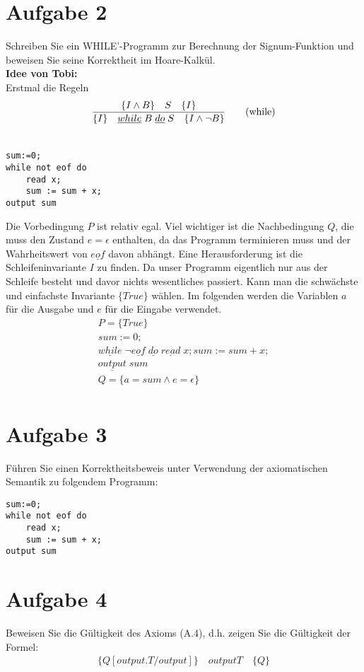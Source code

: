 \documentclass[ngerman,a4paper]{report}
\begin{document}
\section*{Aufgabe 2}
Schreiben Sie ein WHILE'-Programm zur Berechnung der Signum-Funktion und beweisen Sie seine Korrektheit im Hoare-Kalkül.\\
\textbf{Idee von Tobi:}\\
Erstmal die Regeln
\begin{align}
\frac{\{I\land B\}\quad S\quad\{I\}}{\{I\}\quad \underline{while}\;B\;\underline{do}\;S\quad\{I\land \lnot B\}}\tag{while}\\
\notag
\end{align}
\begin{lstlisting}
sum:=0;
while not eof do
	read x;
	sum := sum + x;
output sum
\end{lstlisting}
Die Vorbedingung $P$ ist relativ egal. Viel wichtiger ist die Nachbedingung $Q$, die muss den Zustand $e=\epsilon$ enthalten, da das Programm terminieren muss und der Wahrheitswert von $\underline{eof}$ davon abhängt. Eine Herausforderung ist die Schleifeninvariante $I$ zu finden. Da unser Programm eigentlich nur aus der Schleife besteht und davor nichts wesentliches passiert. Kann man die schwächste und einfachste Invariante $\{True\}$ wählen. Im folgenden werden die Variablen $a$ für die Ausgabe und $e$ für die Eingabe verwendet.
\begin{align*}
P = \{True\}	\\
sum:=0;																		\\
\underline{while}\; \lnot \underline{eof}\; \underline{do}\;
	\underline{read}\; x;
	sum := sum + x;															\\
\underline{output}\; sum																	\\
Q = \{a = sum \land e = \epsilon \}\\
\end{align*}
\section*{Aufgabe 3}
Führen Sie einen Korrektheitsbeweis unter Verwendung der axiomatischen Semantik zu folgendem Programm:\\
\begin{lstlisting}
sum:=0;
while not eof do
	read x;
	sum := sum + x;
output sum
\end{lstlisting}
\section*{Aufgabe 4}
Beweisen Sie die Gültigkeit des Axioms (A.4), d.h. zeigen Sie die Gültigkeit der Formel:
\begin{align*}
\{Q[output.T/output]\}\quad
output T\quad
\{Q\}
\end{align*}
\end{document}
